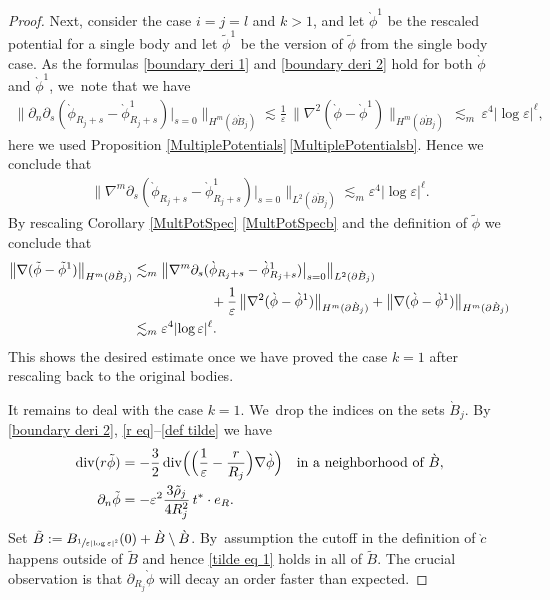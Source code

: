 \documentclass[JEP,XML,SOM,Unicode,published]{cedram}
\let\epsilon\varepsilon
\let\backslash\setminus
\theoremstyle{definition}
\renewcommand{\div}{\operatorname{div}}
\newcommand\bnorm[1]{\bigl\lVert #1\bigr\rVert}
\newcommand\eq{=}
\let\de\partial
\let\eps\epsilon
\begin{document}
\begin{proof}
Next, consider the case $i=j=l$ and $k>1$, and let $\grave{\phi}^1$ be the rescaled potential for a single body and let $\tilde{\phi}^1$ be the version of $\tilde{\phi}$ from the single body case. As the formulas \eqref{boundary deri 1} and \eqref{boundary deri 2} hold for both $\grave{\phi}$ and $\grave{\phi}^1$, we~note that we have
\begin{align*}
\bnorm{\de_n\de_{s}(\grave{\phi}_{R_j+s}-\grave{\phi}_{R_j+s}^1)\big|_{s=0}}_{H^m(\de\grave{B}_j)}\lesssim \frac{1}{\eps}\,\bnorm{\nabla^2(\grave{\phi}-\grave{\phi}^1)}_{H^m(\de\grave{B}_j)}\,\lesssim_m \, \eps^{4}|{\log\eps}|^\ell,
\end{align*}
here we used Proposition \ref{MultiplePotentials}\,\eqref{MultiplePotentialsb}. Hence we conclude that
\begin{align*}
\bnorm{\nabla^m\de_{s}(\grave{\phi}_{R_j+s}-\grave{\phi}_{R_j+s}^1)\big|_{s=0}}_{L^2(\de\grave{B}_j)}\lesssim_m\eps^{4}|{\log\eps}|^\ell.
\end{align*}
By rescaling Corollary \ref{MultPotSpec} \eqref{MultPotSpecb} and the definition of $\tilde{\phi}$ we conclude that
\begin{align*}
\bnorm{\nabla(\tilde{\phi}-\tilde{\phi}^1)}_{H^m(\de\grave{B}_j)}&\lesssim_m \bnorm{\nabla^m\de_{s}(\grave{\phi}_{R_j+s}-\grave{\phi}_{R_j+s}^1)\big|_{s=0}}_{L^2(\de\grave{B}_j)}\\
&\hspace*{2cm}+ \frac{1}{\eps}\,\bnorm{\nabla^2(\grave{\phi}-\grave{\phi}^1)}_{H^m(\de\grave{B}_j)}+\bnorm{\nabla(\grave{\phi}-\grave{\phi}^1)}_{H^m(\de\grave{B}_j)}\\
&\lesssim_m \eps^{4}|{\log\eps}|^\ell.
\end{align*}
This shows the desired estimate once we have proved the case $k=1$ after rescaling back to the original bodies.

It remains to deal with the case $k=1$. We~drop the indices on the sets $\grave{B}_j$.
By \eqref{boundary deri 2}, \eqref{r eq}--\eqref{def tilde} we have
\begin{align}
\div(r\tilde{\phi})&\eq-\frac{3}{2}\div\Bigl(\Bigl(\frac{1}{\eps}-\frac{r}{R_j}\Bigr)\nabla\grave{\phi}\Bigr)\quad\text{in a neighborhood of $\grave{B}$},\label{tilde eq 1}\\
\de_n\tilde{\phi}&\eq-\eps^2\frac{3\tilde{\rho}_j}{4R_j^2}\,t^*\cdot e_R\label{tilde eq 2}.
\end{align}
Set $\tilde{B}:=B_{\sfrac{1}{\eps|{\log\eps}|^2}}(0)+\grave{B}\backslash\grave{B}$. By~assumption the cutoff in the definition of $\grave{c}$ happens outside of $\tilde{B}$ and hence \eqref{tilde eq 1} holds in all of $\tilde{B}$.
The crucial observation is that $\de_{R_j}\grave{\phi}$ will decay an order faster than expected.


\end{proof}
\end{document}
